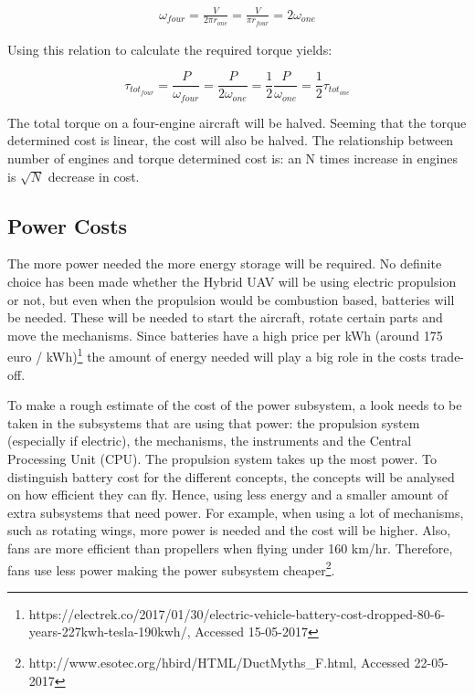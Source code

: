 \begin{equation}\label{eq:prooftor}
\begin{aligned}
    \omega_{four} = \frac{V}{2 \pi r_{one}} = \frac{V}{\pi r_{four}} = 2 \omega_{one}
\end{aligned}
\end{equation}

Using this relation to calculate the required torque yields:

\begin{equation}\label{eq:prooftor2}
    \tau_{tot_{four}} = \frac{P}{\omega_{four}} = \frac{P}{2\omega_{one}} = \frac{1}{2} \frac{P}{\omega_{one}} = \frac{1}{2}\tau_{tot_{one}}
\end{equation}

The total torque on a four-engine aircraft will be halved. Seeming that the torque determined cost is linear, the cost will also be halved. The relationship between number of engines and torque determined cost is: an N times increase in engines is $\sqrt{N}$ decrease in cost.


\subsection*{Power Costs}

The more power needed the more energy storage will be required. No definite choice has been made whether the Hybrid UAV will be using electric propulsion or not, but even when the propulsion would be combustion based, batteries will be needed. These will be needed to start the aircraft, rotate certain parts and move the mechanisms. Since batteries have a high price per kWh (around 175 euro / kWh)\footnote{https://electrek.co/2017/01/30/electric-vehicle-battery-cost-dropped-80-6-years-227kwh-tesla-190kwh/, Accessed 15-05-2017} the amount of energy needed will play a big role in the costs trade-off. 

To make a rough estimate of the cost of the power subsystem, a look needs to be taken in the subsystems that are using that power: the propulsion system (especially if electric), the mechanisms, the instruments and the Central Processing Unit (CPU). The propulsion system takes up the most power. To distinguish battery cost for the different concepts, the concepts will be analysed on how efficient they can fly. Hence, using less energy and a smaller amount of extra subsystems that need power. For example, when using a lot of mechanisms, such as rotating wings, more power is needed and the cost will be higher. Also, fans are more efficient than propellers when flying under 160 km/hr. Therefore, fans use less power making the power subsystem cheaper\footnote{http://www.esotec.org/hbird/HTML/DuctMyths\_F.html, Accessed 22-05-2017}.


